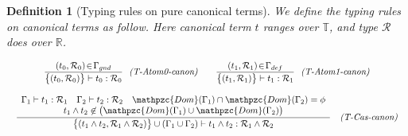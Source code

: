 \documentclass[12pt]{article}
\newtheorem{Definition}{Definition}[section]
\begin{document}
\pagebreak
\begin{Definition}[Typing rules on pure canonical terms]
  We define the typing rules on canonical terms as follow.
  Here canonical term $t$ ranges over $\mathbb{T}$, and type $\mathcal{R}$
  does over $\mathbb{R}$.
  
  \begin{displaymath}
    \begin{array}{c}
      
      \begin{array}{rl}
        \begin{array}{rl}
          \dfrac{
            (t_0, \mathcal{R}_0) \!\in\! \Gamma_{gnd}
          }{
            \bigl\{(t_0, \mathcal{R}_0) \bigr\} \vdash t_0 : \mathcal{R}_0
          }  &  \!\! \text{\it (T-Atom0-canon)}
        \end{array}
        
        & \begin{array}{rl}
            \dfrac{
              (t_1, \mathcal{R}_1) \!\in\! \Gamma_{def}
            }{
              \bigl\{(t_1, \mathcal{R}_1) \bigr\} \vdash t_1 : \mathcal{R}_1
            }  &  \!\! \text{\it (T-Atom1-canon)}
          \end{array}
      \end{array}  \\
      \\
      
      \begin{array}{rl}
        \dfrac{
          \begin{array}{c}
            \Gamma_1 \vdash t_1 : \mathcal{R}_1
             \quad \Gamma_2 \vdash t_2 : \mathcal{R}_2
              \quad \mathpzc{Dom}(\Gamma_1) \cap \mathpzc{Dom}(\Gamma_2)
              = \phi  \\
              t_1 \wedge t_2 \not\in \bigl(\mathpzc{Dom}(\Gamma_1) \cup
               \mathpzc{Dom}(\Gamma_2) \bigr)
          \end{array}
        }{
          \bigl\{(t_1 \wedge t_2, \mathcal{R}_1 \wedge \mathcal{R}_2)
           \bigr\} \cup (\Gamma_1 \cup \Gamma_2) \vdash
            t_1 \wedge t_2 : \mathcal{R}_1 \wedge \mathcal{R}_2
        }  &  \text{\it (T-Cas-canon)}  \\
        \\
        

\end{array}
\end{array}
\end{displaymath}
\end{Definition}
\end{document}
